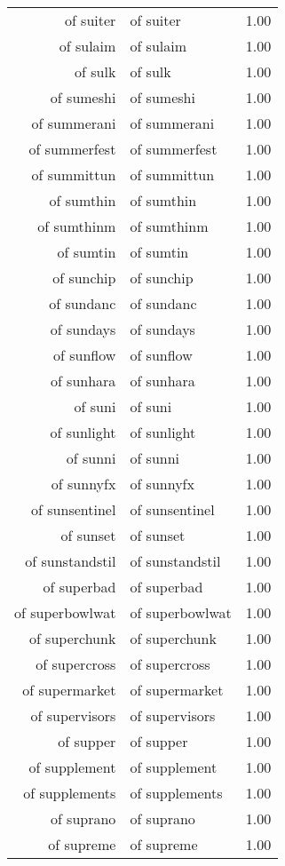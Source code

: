 \begin{table}[ht]
\begin{tabular}{rlr}
  of suiter & of suiter & 1.00 \\ 
  of sulaim & of sulaim & 1.00 \\ 
  of sulk & of sulk & 1.00 \\ 
  of sumeshi & of sumeshi & 1.00 \\ 
  of summerani & of summerani & 1.00 \\ 
  of summerfest & of summerfest & 1.00 \\ 
  of summittun & of summittun & 1.00 \\ 
  of sumthin & of sumthin & 1.00 \\ 
  of sumthinm & of sumthinm & 1.00 \\ 
  of sumtin & of sumtin & 1.00 \\ 
  of sunchip & of sunchip & 1.00 \\ 
  of sundanc & of sundanc & 1.00 \\ 
  of sundays & of sundays & 1.00 \\ 
  of sunflow & of sunflow & 1.00 \\ 
  of sunhara & of sunhara & 1.00 \\ 
  of suni & of suni & 1.00 \\ 
  of sunlight & of sunlight & 1.00 \\ 
  of sunni & of sunni & 1.00 \\ 
  of sunnyfx & of sunnyfx & 1.00 \\ 
  of sunsentinel & of sunsentinel & 1.00 \\ 
  of sunset & of sunset & 1.00 \\ 
  of sunstandstil & of sunstandstil & 1.00 \\ 
  of superbad & of superbad & 1.00 \\ 
  of superbowlwat & of superbowlwat & 1.00 \\ 
  of superchunk & of superchunk & 1.00 \\ 
  of supercross & of supercross & 1.00 \\ 
  of supermarket & of supermarket & 1.00 \\ 
  of supervisors & of supervisors & 1.00 \\ 
  of supper & of supper & 1.00 \\ 
  of supplement & of supplement & 1.00 \\ 
  of supplements & of supplements & 1.00 \\ 
  of suprano & of suprano & 1.00 \\ 
  of supreme & of supreme & 1.00 \\ 

\end{tabular}
\end{table}
